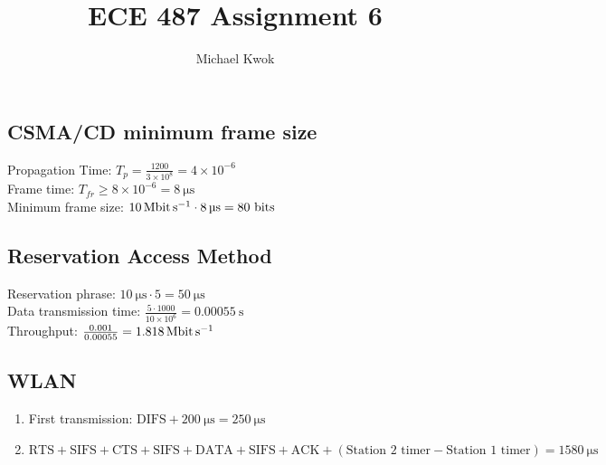 \documentclass{article}
\title{ECE 487 Assignment 6}
\author{Michael Kwok}
\begin{document}
\maketitle
\subsection*{CSMA/CD minimum frame size}
Propagation Time: \(T_p = \frac{1200}{3 \times 10^8} = 4\times 10 ^{-6}\) \\
Frame time: \(T_{fr} \geq 8 \times 10^{-6} = \SI{8}{\micro\second}\) \\
Minimum frame size: \( \SI{10}{\mega\bit\per\second} \cdot \SI{8}{\micro\second} = 80 \text{ bits}\)

\subsection*{Reservation Access Method}
Reservation phrase: \(\SI{10}{\micro\second} \cdot 5 = \SI{50}{\micro\second}\) \\
Data transmission time: \( \frac{5 \cdot 1000}{10 \times 10^6} = \SI{0.00055}{\second} \) \\
Throughput: \(\frac{0.001}{0.00055} = \SI{1.818}{\mega\bit\per\second}\)

\subsection*{WLAN}
\begin{enumerate}
    \item First transmission: \(\text{DIFS} + \SI{200}{\micro\second} = \SI{250}{\micro\second}\)
    \item \(\text{RTS}+ \text{SIFS} + \text{CTS} + \text{SIFS} + \text{DATA} + \text{SIFS} + \text{ACK} + (\text{Station 2 timer} - \text{Station 1 timer}) = \SI{1580}{\micro\second}\)
\end{enumerate}
\end{document}
